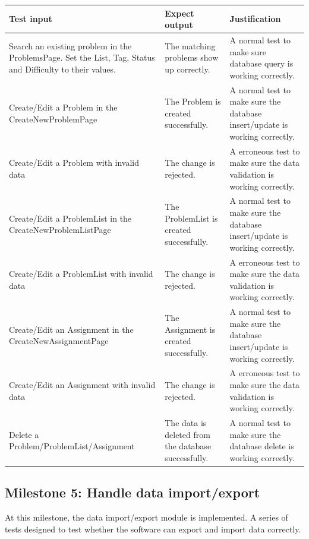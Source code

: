 \documentclass[a4paper]{report}
\begin{document}
\begin{tabulary}{\textwidth}{|L|L|L|}
    \hline
    Test input & Expect output & Justification \\
    \hline
    Search an existing problem in the ProblemsPage. Set the List, Tag, Status and Difficulty to their values. & The matching problems show up correctly. & A normal test to make sure database query is working correctly. \\
    \hline
    Create/Edit a Problem in the CreateNewProblemPage & The Problem is created successfully. & A normal test to make sure the database insert/update is working correctly. \\
    \hline
    Create/Edit a Problem with invalid data & The change is rejected. & A erroneous test to make sure the data validation is working correctly. \\
    \hline
    Create/Edit a ProblemList in the CreateNewProblemListPage & The ProblemList is created successfully. & A normal test to make sure the database insert/update is working correctly. \\
    \hline
    Create/Edit a ProblemList with invalid data & The change is rejected. & A erroneous test to make sure the data validation is working correctly. \\
    \hline
    Create/Edit an Assignment in the CreateNewAssignmentPage & The Assignment is created successfully. & A normal test to make sure the database insert/update is working correctly. \\
    \hline
    Create/Edit an Assignment with invalid data & The change is rejected. & A erroneous test to make sure the data validation is working correctly. \\
    \hline
    Delete a Problem/ProblemList/Assignment & The data is deleted from the database successfully. & A normal test to make sure the database delete is working correctly. \\
    \hline
\end{tabulary}

\subsection{Milestone 5: Handle data import/export}

At this milestone, the data import/export module is implemented. A series of tests designed to test whether the software can export and import data correctly.
\end{document}
